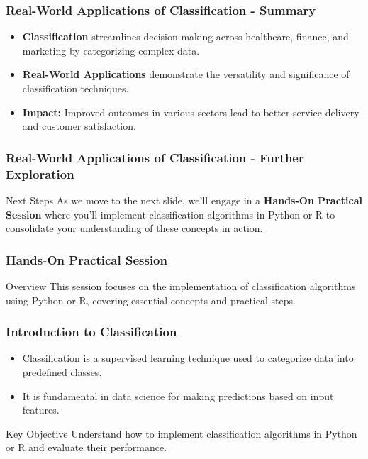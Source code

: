 \documentclass[aspectratio=169]{beamer}
\begin{document}
\begin{frame}[fragile]
    \frametitle{Real-World Applications of Classification - Summary}
    \begin{itemize}
        \item \textbf{Classification} streamlines decision-making across healthcare, finance, and marketing by categorizing complex data.
        \item \textbf{Real-World Applications} demonstrate the versatility and significance of classification techniques.
        \item \textbf{Impact:} Improved outcomes in various sectors lead to better service delivery and customer satisfaction.
    \end{itemize}
\end{frame}

\begin{frame}[fragile]
    \frametitle{Real-World Applications of Classification - Further Exploration}
    \begin{block}{Next Steps}
        As we move to the next slide, we'll engage in a \textbf{Hands-On Practical Session} where you'll implement classification algorithms in Python or R to consolidate your understanding of these concepts in action.
    \end{block}
\end{frame}

\begin{frame}[fragile]
    \frametitle{Hands-On Practical Session}
    \begin{block}{Overview}
        This session focuses on the implementation of classification algorithms using Python or R, covering essential concepts and practical steps.
    \end{block}
\end{frame}

\begin{frame}[fragile]
    \frametitle{Introduction to Classification}
    \begin{itemize}
        \item Classification is a supervised learning technique used to categorize data into predefined classes.
        \item It is fundamental in data science for making predictions based on input features.
    \end{itemize}
    \begin{block}{Key Objective}
        Understand how to implement classification algorithms in Python or R and evaluate their performance.
    \end{block}
\end{frame}
\end{document}
